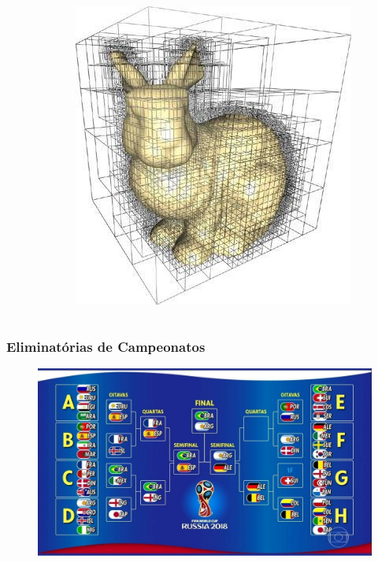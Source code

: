 \documentclass[aspectratio=169]{beamer}
\begin{document}
\begin{frame}
\begin{columns}[T]
\begin{column}{0.34\linewidth}
\end{column}
\begin{column}{0.30\linewidth}
\begin{figure}[h]
	\centering
	\includegraphics[height=0.45\paperheight]{imagens/coelho.jpg}
\end{figure}
\end{column}
\end{columns}
\end{frame}

\begin{frame}\frametitle{Eliminatórias de Campeonatos}
\begin{figure}[h]
	\centering
	\includegraphics[height=0.70\paperheight]{imagens/copa_russia_2018.jpg}
\end{figure}
\end{frame}
\end{document}
